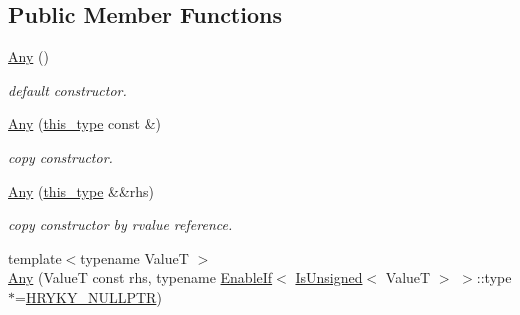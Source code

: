 \subsection*{Public Member Functions}
\begin{DoxyCompactItemize}
\item 
\hypertarget{classhryky_1_1_any_a3d0d9135c798b3bfb4428fc04f168414}{\hyperlink{classhryky_1_1_any_a3d0d9135c798b3bfb4428fc04f168414}{Any} ()}\label{classhryky_1_1_any_a3d0d9135c798b3bfb4428fc04f168414}

\begin{DoxyCompactList}\small\item\em default constructor. \end{DoxyCompactList}\item 
\hypertarget{classhryky_1_1_any_aa95b8ee5fd959cbcf14a63ba5fe40ab1}{\hyperlink{classhryky_1_1_any_aa95b8ee5fd959cbcf14a63ba5fe40ab1}{Any} (\hyperlink{classhryky_1_1_any_accb3d649460111ed6f04293f3e5865bc}{this\-\_\-type} const \&)}\label{classhryky_1_1_any_aa95b8ee5fd959cbcf14a63ba5fe40ab1}

\begin{DoxyCompactList}\small\item\em copy constructor. \end{DoxyCompactList}\item 
\hypertarget{classhryky_1_1_any_a4ceb1ab2d59e3d07a6dd1186ecb2b2c5}{\hyperlink{classhryky_1_1_any_a4ceb1ab2d59e3d07a6dd1186ecb2b2c5}{Any} (\hyperlink{classhryky_1_1_any_accb3d649460111ed6f04293f3e5865bc}{this\-\_\-type} \&\&rhs)}\label{classhryky_1_1_any_a4ceb1ab2d59e3d07a6dd1186ecb2b2c5}

\begin{DoxyCompactList}\small\item\em copy constructor by rvalue reference. \end{DoxyCompactList}\item 
\hypertarget{classhryky_1_1_any_a29310c8ac9eb7914a68da33ac430ba9f}{{\footnotesize template$<$typename Value\-T $>$ }\\\hyperlink{classhryky_1_1_any_a29310c8ac9eb7914a68da33ac430ba9f}{Any} (Value\-T const rhs, typename \hyperlink{classhryky_1_1_enable_if}{Enable\-If}$<$ \hyperlink{classhryky_1_1_is_unsigned}{Is\-Unsigned}$<$ Value\-T $>$ $>$\-::type $\ast$=\hyperlink{common_8h_a4cd4ac09cfcdbd6b30ee69afc156e210}{H\-R\-Y\-K\-Y\-\_\-\-N\-U\-L\-L\-P\-T\-R})}\label{classhryky_1_1_any_a29310c8ac9eb7914a68da33ac430ba9f}


\end{DoxyCompactItemize}
